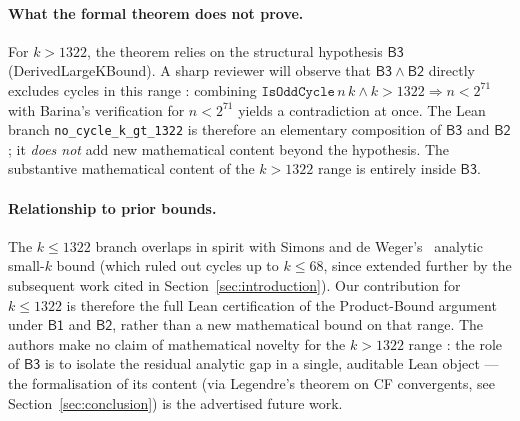 \paragraph{What the formal theorem does not prove.}
For \(k > 1322\), the theorem relies on the structural hypothesis
\(\mathsf{B3}\) (\textsf{DerivedLargeKBound}). A sharp reviewer will
observe that \(\mathsf{B3} \wedge \mathsf{B2}\) directly excludes cycles
in this range : combining
\(\texttt{IsOddCycle}\,n\,k \wedge k > 1322 \Rightarrow n < 2^{71}\)
with Barina's verification for \(n < 2^{71}\) yields a contradiction at
once. The Lean branch \texttt{no\_cycle\_k\_gt\_1322} is therefore an
elementary composition of \(\mathsf{B3}\) and \(\mathsf{B2}\); it
\emph{does not} add new mathematical content beyond the hypothesis. The
substantive mathematical content of the \(k > 1322\) range is entirely
inside \(\mathsf{B3}\).

\paragraph{Relationship to prior bounds.}
The \(k \leq 1322\) branch overlaps in spirit with Simons and de
Weger's~\cite{SimonsDeWeger2005} analytic small-\(k\) bound (which
ruled out cycles up to \(k \leq 68\), since extended further by the
subsequent work cited in Section~\ref{sec:introduction}). Our
contribution for \(k \leq 1322\) is therefore the full Lean
certification of the Product-Bound argument under \(\mathsf{B1}\) and
\(\mathsf{B2}\), rather than a new mathematical bound on that range.
The authors make no claim of mathematical novelty for the
\(k > 1322\) range : the role of \(\mathsf{B3}\) is to isolate the
residual analytic gap in a single, auditable Lean object ---
the formalisation of its content (via Legendre's theorem on CF
convergents, see Section~\ref{sec:conclusion}) is the advertised future
work.

